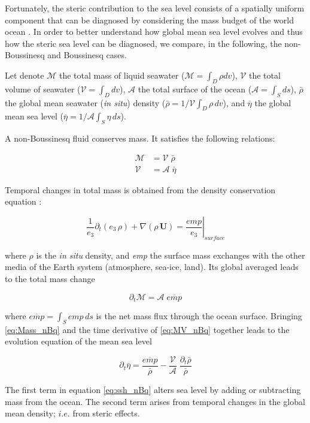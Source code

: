 \documentclass[../tex_main/NEMO_manual]{subfiles}
\begin{document}
Fortunately, the steric contribution to the sea level consists of a spatially uniform component that 
can be diagnosed by considering the mass budget of the world ocean \citep{Greatbatch_JGR94}.
In order to better understand how global mean sea level evolves and thus how the steric sea level can 
be diagnosed, we compare, in the following, the non-Boussinesq and Boussinesq cases.

Let denote
$\mathcal{M}$ the total mass    of liquid seawater ($\mathcal{M} = \int_D \rho dv$), 
$\mathcal{V}$ the total volume  of        seawater      ($\mathcal{V} = \int_D dv$), 
$\mathcal{A}$ the total surface of       the ocean      ($\mathcal{A} = \int_S ds$), 
$\bar{\rho}$ the global mean  seawater (\textit{in situ}) density 
($\bar{\rho} = 1/\mathcal{V} \int_D \rho \,dv$), and
$\bar{\eta}$ the global mean sea level 
($\bar{\eta} = 1/\mathcal{A} \int_S \eta \,ds$).

A non-Boussinesq fluid conserves mass. It satisfies the following relations:

\[	\begin{split}
		\mathcal{M} &=  \mathcal{V}  \;\bar{\rho} \\
		\mathcal{V} &=  \mathcal{A}  \;\bar{\eta}
	\end{split}  \label{eq:MV_nBq}
\]

Temporal changes in total mass is obtained from the density conservation equation :

\[ \frac{1}{e_3} \partial_t ( e_3\,\rho) + \nabla( \rho \, \textbf{U} ) 
	= \left. \frac{\textit{emp}}{e_3}\right|_\textit{surface}
 \label{eq:Co_nBq} \]

where $\rho$ is the \textit{in situ} density, and \textit{emp} the surface mass 
exchanges with the other media of the Earth system (atmosphere, sea-ice, land). 
Its global averaged leads to the total mass change 

\[ \partial_t \mathcal{M} = \mathcal{A} \;\overline{\textit{emp}}
 \label{eq:Mass_nBq} \]

where $\overline{\textit{emp}} = \int_S \textit{emp}\,ds$ is the net mass flux through the ocean surface.
Bringing \autoref{eq:Mass_nBq} and the time derivative of \autoref{eq:MV_nBq} together leads to 
the evolution equation of the mean sea level

\[ \partial_t \bar{\eta} = \frac{\overline{\textit{emp}}}{ \bar{\rho}} 
                         - \frac{\mathcal{V}}{\mathcal{A}} \;\frac{\partial_t \bar{\rho} }{\bar{\rho}}
 \label{eq:ssh_nBq} \]

The first term in equation \autoref{eq:ssh_nBq} alters sea level by adding or 
subtracting mass from the ocean. 
The second term arises from temporal changes in the global mean density; $i.e.$ from steric effects. 
\end{document}
